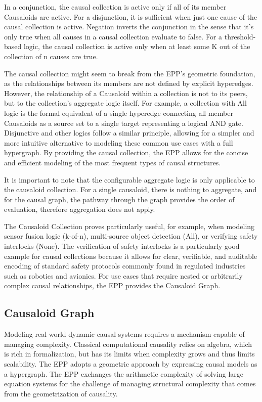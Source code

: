 In a conjunction, the causal collection is active only if all of its member Causaloids are active. For a disjunction, it is sufficient when just one cause of the causal collection is active. Negation inverts the conjunction in the sense that it's only true when all causes in a causal collection evaluate to false. For a threshold-based logic, the causal collection is active only when at least some K out of the collection of n causes are true. 

 The causal collection might seem to break from the EPP's geometric foundation, as the relationships between its members are not defined by explicit hyperedges. However,  the relationship of a Causaloid within a collection is not to its peers, but to the collection's aggregate logic itself. For example, a collection with All logic is the formal equivalent of a single hyperedge connecting all member Causaloids as a source set to a single target representing a logical AND gate. Disjunctive and other logics follow a similar principle, allowing for a simpler and more intuitive alternative to modeling these common use cases with a full hypergraph. By providing the causal collection, the EPP allows for the concise and efficient modeling of the most frequent types of causal structures.
 
 It is important to note that the configurable aggregate logic is only applicable to the causaloid collection. For a single causaloid, there is nothing to aggregate, and for the causal graph, the pathway through the graph provides the order of evaluation, therefore aggregation does not apply. 
 
  The Causaloid Collection proves particularly useful, for example, when modeling sensor fusion logic (k-of-n), multi-source object detection (All), or verifying safety interlocks (None). The verification of safety interlocks is a particularly good example for causal collections because it allows for clear, verifiable, and auditable encoding of standard safety protocols commonly found in regulated industries such as robotics and avionics. For use cases that require nested or arbitrarily complex causal relationships, the EPP provides the Causaloid Graph.

%
%
\subsection{Causaloid Graph}
\label{sec:epp_causaloid_graph}

Modeling real-world dynamic causal systems requires a mechanism capable of managing complexity.
Classical computational causality relies on algebra, which is rich in formalization,
but has its limits when complexity grows and thus limits scalability. The EPP adopts 
a geometric approach by expressing causal models as a hypergraph. The EPP
exchanges the arithmetic complexity of solving large equation systems for the challenge of managing structural complexity that comes from the geometrization of causality.

